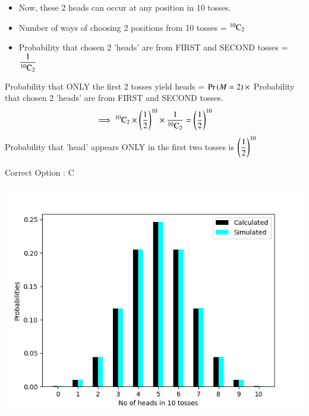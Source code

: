 \documentclass[journal,12pt,twocolumn]{IEEEtran}
\begin{document}
\begin{itemize}
    \item Now, these 2 heads can occur at any position in 10 tosses.
    \item Number of ways of choosing 2 positions from 10 tosses = ${}^{10}\mathrm{C}_{2}$
          \bigskip
    \item Probability that chosen 2 'heads' are from FIRST and SECOND tosses = \(\displaystyle \frac{1}{{}^{10}\mathrm{C}_{2}}\)
          \bigskip
\end{itemize}
Probability that ONLY the first 2 tosses yield heads =  $\Pr\left(M = 2\right) \times$ Probability that chosen 2 'heads' are from FIRST and SECOND tosses.
\bigskip
\begin{align}
    \implies {}^{10}\mathrm{C}_{2} \times \left(\frac{1}{2}\right)^{10} \times \frac{1}{{}^{10}\mathrm{C}_{2}} = \left(\frac{1}{2}\right)^{10}\notag
\end{align}
Probability that 'head' appears ONLY in the first two tosses is $\displaystyle\left(\frac{1}{2}\right)^{10}$\\
\begin{center}
    Correct Option : C
\end{center}
\pagebreak
\includegraphics{Figure-1.png}
\end{document}
